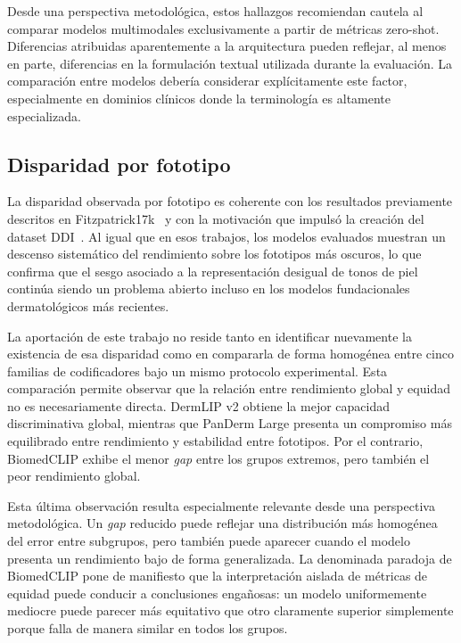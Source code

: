 Desde una perspectiva metodológica, estos hallazgos recomiendan cautela
al comparar modelos multimodales exclusivamente a partir de métricas
zero-shot. Diferencias atribuidas aparentemente a la arquitectura pueden
reflejar, al menos en parte, diferencias en la formulación textual
utilizada durante la evaluación. La comparación entre modelos debería
considerar explícitamente este factor, especialmente en dominios
clínicos donde la terminología es altamente especializada.

\subsection{Disparidad por fototipo}
\label{sec:lit-equidad}

La disparidad observada por fototipo es coherente con los resultados
previamente descritos en Fitzpatrick17k~\cite{fitzpatrick17k} y con la
motivación que impulsó la creación del dataset DDI~\cite{ddi}. Al igual
que en esos trabajos, los modelos evaluados muestran un descenso
sistemático del rendimiento sobre los fototipos más oscuros, lo que
confirma que el sesgo asociado a la representación desigual de tonos de
piel continúa siendo un problema abierto incluso en los modelos
fundacionales dermatológicos más recientes.

La aportación de este trabajo no reside tanto en identificar nuevamente
la existencia de esa disparidad como en compararla de forma homogénea
entre cinco familias de codificadores bajo un mismo protocolo
experimental. Esta comparación permite observar que la relación entre
rendimiento global y equidad no es necesariamente directa. DermLIP v2
obtiene la mejor capacidad discriminativa global, mientras que PanDerm
Large presenta un compromiso más equilibrado entre rendimiento y
estabilidad entre fototipos. Por el contrario, BiomedCLIP exhibe el
menor \emph{gap} entre los grupos extremos, pero también el peor
rendimiento global.

Esta última observación resulta especialmente relevante desde una
perspectiva metodológica. Un \emph{gap} reducido puede reflejar una
distribución más homogénea del error entre subgrupos, pero también puede
aparecer cuando el modelo presenta un rendimiento bajo de forma
generalizada. La denominada paradoja de BiomedCLIP pone de manifiesto
que la interpretación aislada de métricas de equidad puede conducir a
conclusiones engañosas: un modelo uniformemente mediocre puede parecer
más equitativo que otro claramente superior simplemente porque falla de
manera similar en todos los grupos.

